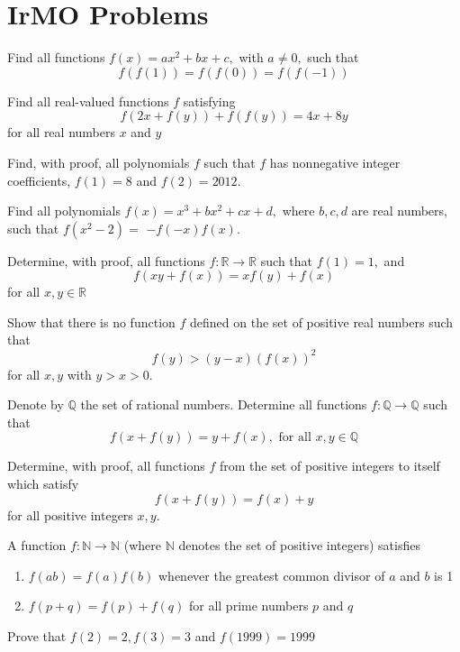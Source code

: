 \documentclass{pset}
\begin{document}
\section*{IrMO Problems}


\begin{problems}


\begin{problem}[IrMO 2018] Find all functions \(f(x)=a x^{2}+b x+c,\) with \(a \neq 0,\) such that
$$
f(f(1))=f(f(0))=f(f(-1))
$$
\end{problem}
\begin{problem}[IrMO 2018] Find all real-valued functions \(f\) satisfying
$$
f(2 x+f(y))+f(f(y))=4 x+8 y
$$
for all real numbers \(x\) and \(y\)\end{problem}
\begin{problem}[IrMO 2012] Find, with proof, all polynomials \(f\) such that \(f\) has nonnegative integer coefficients, \(f(1)=8\) and \(f(2)=2012\).\end{problem}
\begin{problem}[IrMO 2010] Find all polynomials \(f(x)=x^{3}+b x^{2}+c x+d,\) where \(b, c, d\) are real numbers, such that \(f\left(x^{2}-2\right)=\) \(-f(-x) f(x)\).\end{problem}
\begin{problem}[IrMO 2006] Determine, with proof, all functions \(f: \mathbb{R} \rightarrow \mathbb{R}\) such that \(f(1)=1,\) and
$$
f(x y+f(x))=x f(y)+f(x)
$$
for all \(x, y \in \mathbb{R}\)\end{problem}
\begin{problem}[IrMO 2003] Show that there is no function \(f\) defined on the set of positive real numbers such that
$$
f(y)>(y-x)(f(x))^{2}
$$
for all \(x, y\) with \(y>x>0\).\end{problem}
\begin{problem}[IrMO 2002] Denote by \(\mathbb{Q}\) the set of rational numbers. Determine all functions \(f: \mathbb{Q} \longrightarrow \mathbb{Q}\) such that
$$
f(x+f(y))=y+f(x), \text { for all } x, y \in \mathbb{Q}
$$\end{problem}
\begin{problem}[IrMO 2001] Determine, with proof, all functions \(f\) from the set of positive integers to itself which satisfy 
$$f(x+f(y))=f(x)+y$$
for all positive integers \(x, y .\)\end{problem}
\begin{problem}[IrMO 1999] A function \(f: \mathbb{N} \rightarrow \mathbb{N}\) (where \(\mathbb{N}\) denotes the set of positive integers) satisfies
\begin{enumerate}
    \item\(f(a b)=f(a) f(b)\) whenever the greatest common divisor of \(a\) and \(b\) is 1
    \item\(f(p+q)=f(p)+f(q)\) for all prime numbers \(p\) and \(q\)
\end{enumerate} 
Prove that \(f(2)=2, f(3)=3\) and \(f(1999)=1999\)\end{problem}


\end{problems}
\end{document}
